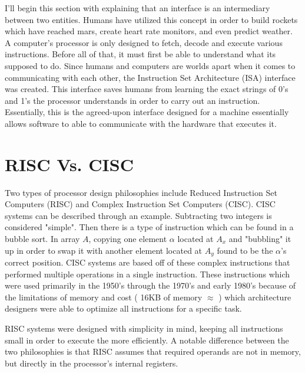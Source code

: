 \documentclass[12pt]{scrreprt}
\begin{document}
	I'll begin this section with explaining that an interface is an intermediary between two entities.
	Humans have utilized this concept in order to build rockets which have reached mars, create heart rate monitors, and even predict weather. 
	A computer's processor is only designed to fetch, decode and execute various instructions.
	Before all of that, it must first be able to understand what its supposed to do.
	Since humans and computers are worlds apart when it comes to communicating with each other, the Instruction Set Architecture (ISA) interface was created.
	This interface saves humans from learning the exact strings of 0's and 1's the processor understands in order to carry out an instruction.
	Essentially, this is the agreed-upon interface designed for a machine essentially allows software to able to communicate with the hardware that executes it.

	\section{RISC Vs. CISC}

	Two types of processor design philosophies include Reduced Instruction Set Computers (RISC) and Complex Instruction Set Computers (CISC).
	CISC systems can be described through an example. Subtracting two integers is considered "simple". Then there is a type of instruction which 
	can be found in a bubble sort. In array $ A $, copying one element $ \alpha $ located at $ A_{x} $ and "bubbling" it up in order to swap it
	with another element located at $ A_{y} $ found to be the $ \alpha $'s correct position. CISC systems are based off of these complex 
	instructions that performed multiple operations in a single instruction. These instructions which were used primarily in the 1950's through the 1970's and early 1980's because of the limitations of memory and cost ( 16KB of memory $\approx$  ) which architecture designers were able to optimize all instructions for a specific task.

	RISC systems were designed with simplicity in mind, keeping all instructions small in order to execute the more efficiently. A notable
	difference between the two philosophies is that RISC assumes that required operands are not in memory, but directly in the processor's
	internal registers.
\end{document}

